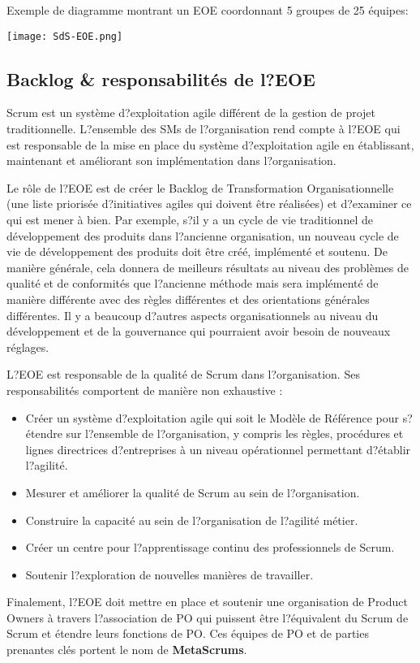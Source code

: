 \documentclass[12pt,a4paper,parskip=full]{scrartcl}
\begin{document}
\pagebreak
Exemple de diagramme montrant un EOE coordonnant 5 groupes de 25 équipes:

\texttt{[image: SdS-EOE.png]}

\subsection{Backlog \& responsabilités de l?EOE}
Scrum est un système d?exploitation agile différent de la gestion de projet traditionnelle.
L?ensemble des SMs de l?organisation rend compte à l?EOE qui est responsable de la mise
en place du système d?exploitation agile en établissant, maintenant et améliorant son
implémentation dans l?organisation.

Le rôle de l?EOE est de créer le Backlog de Transformation Organisationnelle (une liste
priorisée d?initiatives agiles qui doivent être réalisées) et d?examiner ce qui est mener à
bien. Par exemple, s?il y a un cycle de vie traditionnel de développement des produits dans
l?ancienne organisation, un nouveau cycle de vie de développement des produits doit être
créé, implémenté et soutenu. De manière générale, cela donnera de meilleurs résultats au
niveau des problèmes de qualité et de conformités que l?ancienne méthode mais sera
implémenté de manière différente avec des règles différentes et des orientations
générales différentes. Il y a beaucoup d?autres aspects organisationnels au niveau du
développement et de la gouvernance qui pourraient avoir besoin de nouveaux réglages.

L?EOE est responsable de la qualité de Scrum dans l?organisation. Ses responsabilités
comportent de manière non exhaustive :
\begin{itemize}
\item Créer un système d?exploitation agile qui soit le Modèle de Référence pour
s?étendre sur l?ensemble de l?organisation, y compris les règles, procédures et
lignes directrices d?entreprises à un niveau opérationnel permettant d?établir
l?agilité.
\item Mesurer et améliorer la qualité de Scrum au sein de l?organisation.
\item Construire la capacité au sein de l?organisation de l?agilité métier.
\item Créer un centre pour l?apprentissage continu des professionnels de Scrum.
\item Soutenir l?exploration de nouvelles manières de travailler.
\end{itemize}
Finalement, l?EOE doit mettre en place et soutenir une organisation de Product Owners à
travers l?association de PO qui puissent être l?équivalent du Scrum de Scrum et étendre
leurs fonctions de PO. Ces équipes de PO et de parties prenantes clés portent le nom de
\textbf{MetaScrums}.
\end{document}
